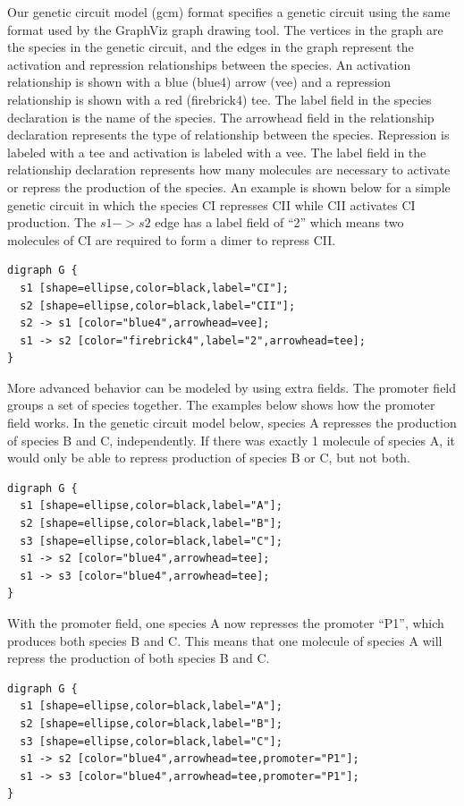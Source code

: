 \documentclass[titlepage,11pt]{article}
\begin{document}
\noindent
Our genetic circuit model (gcm) format specifies a genetic
circuit using the same format used by the GraphViz graph drawing
tool.  The vertices in the graph are the species in
the genetic circuit, and the edges in the graph represent the
activation and repression relationships between the species. An
activation relationship is shown with a blue (blue4) arrow (vee)
and a repression relationship is shown with a red (firebrick4)
tee. The label field in the species declaration is the name of
the species. The arrowhead field in the relationship declaration
represents the type of relationship between the species.
Repression is labeled with a tee and activation is labeled with a
vee. The label field in the relationship declaration represents
how many molecules are necessary to activate or repress the
production of the species. An example is shown below for a simple
genetic circuit in which the species CI represses CII while CII
activates CI production. The $s1 -> s2$ edge has a label field of
``2'' which means two molecules of CI are required to form a dimer 
to repress CII. 

\begin{verbatim}
digraph G {
  s1 [shape=ellipse,color=black,label="CI"];
  s2 [shape=ellipse,color=black,label="CII"];
  s2 -> s1 [color="blue4",arrowhead=vee];
  s1 -> s2 [color="firebrick4",label="2",arrowhead=tee];
}
\end{verbatim}

More advanced behavior can be modeled by using extra fields.
The promoter field groups a set of species together. The examples
below shows how the promoter field works. In the genetic circuit
model below, species A represses the production of species B and
C, independently. If there was exactly 1 molecule of species A,
it would only be able to repress production of species B or C,
but not both. 

\begin{verbatim}
digraph G {
  s1 [shape=ellipse,color=black,label="A"];
  s2 [shape=ellipse,color=black,label="B"];
  s3 [shape=ellipse,color=black,label="C"];
  s1 -> s2 [color="blue4",arrowhead=tee];
  s1 -> s3 [color="blue4",arrowhead=tee];
} 
\end{verbatim}

With the promoter field, one species A now represses the
promoter ``P1'', which produces both species B and C.
This means that one molecule of species A will repress the
production of both species B and C. 

\begin{verbatim}
digraph G {
  s1 [shape=ellipse,color=black,label="A"];
  s2 [shape=ellipse,color=black,label="B"];
  s3 [shape=ellipse,color=black,label="C"];
  s1 -> s2 [color="blue4",arrowhead=tee,promoter="P1"];
  s1 -> s3 [color="blue4",arrowhead=tee,promoter="P1"];
}
\end{verbatim}
\end{document}

